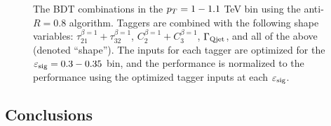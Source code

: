 \begin{figure}
\caption{The BDT combinations in the $p_T = 1-1.1$ TeV bin using the anti-\kT $R=0.8$ algorithm. Taggers are combined with the following shape variables: $\tau_{21}^{\beta=1}+\tau_{32}^{\beta=1}$, $C_{2}^{\beta=1}+C_{3}^{\beta=1}$, $\Gamma_{\rm Qjet}$, and all of the above (denoted ``shape''). The inputs for each tagger are optimized for the $\varepsilon_{\rm sig}=0.3-0.35$ bin, and the performance is normalized to the performance using the optimized tagger inputs at each $\varepsilon_{\rm sig}$.}
\label{fig:pt1000_allcompare_AKt_R08_eps0_35}
\end{figure}




\subsection{Conclusions}


